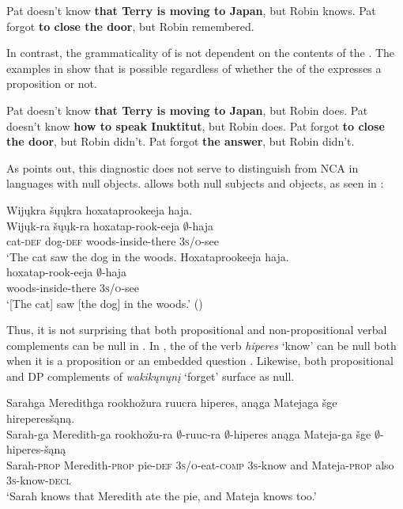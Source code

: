 \documentclass[output=paper]{LSP/langsci}
\begin{document}
\ea\label{ex:johnson:29}
\ea\label{ex:johnson:29a} 
Pat doesn't know \textbf{that Terry is moving to Japan}, but Robin knows.
\label{ex:johnson:29b}
\ex\label{ex:johnson:29c}
Pat forgot \textbf{to close the door}, but Robin remembered.
\label{ex:johnson:29d}
\z
\z

In contrast, the grammaticality of  is not dependent on the contents of the . The examples in  show that  is possible regardless of whether the  of the  expresses a proposition or not.
 
\ea\label{ex:johnson:30}
\ea 
Pat doesn't know \textbf{that Terry is moving to Japan}, but Robin does.
\ex 
Pat doesn't know \textbf{how to speak Inuktitut}, but Robin does.
\ex 
Pat forgot \textbf{to close the door}, but Robin didn't.
\ex 
Pat forgot \textbf{the answer}, but Robin didn't.
\z
\z

As \citet{Fortin2007} points out, this diagnostic does not serve to distinguish  from NCA in languages with null objects.  allows both null subjects and objects, as seen in :

 
\ea
\ea 
\glll Wijųkra šųųkra hoxataprookeeja haja.\\
Wijųk-ra šųųk-ra hoxatap-rook-eeja $\emptyset$-haja\\
cat-\textsc{def} dog-\textsc{def} woods-inside-there \textsc{3s/o}-see\\
\trans `The cat saw the dog in the woods. 
\ex\label{ex:johnson:31b} 
\glll Hoxataprookeeja haja.\\
hoxatap-rook-eeja $\emptyset$-haja\\
woods-inside-there \textsc{3s/o}-see\\
\trans `[The cat] saw [the dog] in the woods.' (\citealt[7]{JohnsonEtAl2013b})
\z
\z


Thus, it is not surprising that both propositional and non-propositional verbal complements can be null in . In , the  of the verb \emph{hiperes} `know' can be null both when it is a proposition  or an embedded question . Likewise, both propositional  and DP   complements of \emph{wakikųnųnį} `forget' surface as null.
 
\ea\label{ex:johnson:32}
\ea\label{ex:johnson:32a} 
\glll Sarahga Meredithga rookhožura ruucra hiperes, anąga Matejaga šge hireperesšąną.\\
Sarah-ga Meredith-ga rookhožu-ra $\emptyset$-ruuc-ra $\emptyset$-hiperes anąga Mateja-ga šge $\emptyset$-hiperes-šąną\\
Sarah-\textsc{prop} Meredith-\textsc{prop} pie-\textsc{def} \textsc{3s/o}-eat-\textsc{comp} \textsc{3s}-know and Mateja-\textsc{prop} also \textsc{3s}-know-\textsc{decl}\\
\trans `Sarah knows that Meredith ate the pie, and Mateja knows too.'
 
\end{document}
